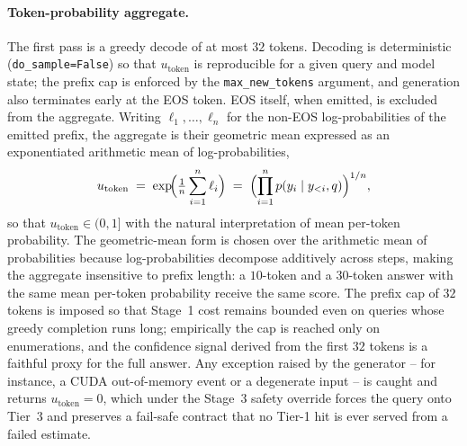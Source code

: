 \paragraph{Token-probability aggregate.}
The first pass is a greedy decode of at most $32$ tokens. Decoding is deterministic (\texttt{do\_sample=False}) so that $u_{\text{token}}$ is reproducible for a given query and model state; the prefix cap is enforced by the \texttt{max\_new\_tokens} argument, and generation also terminates early at the EOS token. EOS itself, when emitted, is excluded from the aggregate. Writing $\ell_{1},\dots,\ell_{n}$ for the non-EOS log-probabilities of the emitted prefix, the aggregate is their geometric mean expressed as an exponentiated arithmetic mean of log-probabilities,
\begin{equation}
u_{\text{token}} \;=\; \exp\!\Bigl(\tfrac{1}{n}\sum_{i=1}^{n}\ell_{i}\Bigr)
\;=\; \Bigl(\prod_{i=1}^{n} p(y_{i}\mid y_{<i}, q)\Bigr)^{1/n},
\label{eq:utoken}
\end{equation}
so that $u_{\text{token}} \in (0,1]$ with the natural interpretation of mean per-token probability. The geometric-mean form is chosen over the arithmetic mean of probabilities because log-probabilities decompose additively across steps, making the aggregate insensitive to prefix length: a $10$-token and a $30$-token answer with the same mean per-token probability receive the same score. The prefix cap of $32$ tokens is imposed so that Stage~1 cost remains bounded even on queries whose greedy completion runs long; empirically the cap is reached only on enumerations, and the confidence signal derived from the first $32$ tokens is a faithful proxy for the full answer. Any exception raised by the generator -- for instance, a CUDA out-of-memory event or a degenerate input -- is caught and returns $u_{\text{token}} = 0$, which under the Stage~3 safety override forces the query onto Tier~3 and preserves a fail-safe contract that no Tier-1 hit is ever served from a failed estimate.

